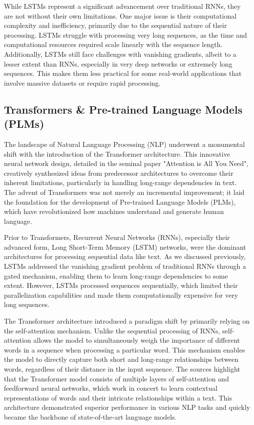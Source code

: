 While LSTMs represent a significant advancement over traditional RNNs, they are not without their own limitations. One major issue is their computational complexity and inefficiency, primarily due to the sequential nature of their processing. LSTMs struggle with processing very long sequences, as the time and computational resources required scale linearly with the sequence length. Additionally, LSTMs still face challenges with vanishing gradients, albeit to a lesser extent than RNNs, especially in very deep networks or extremely long sequences. This makes them less practical for some real-world applications that involve massive datasets or require rapid processing.

\subsection{Transformers \& Pre-trained Language Models (PLMs)}

The landscape of Natural Language Processing (NLP) underwent a monumental shift with the introduction of the Transformer architecture. This innovative neural network design, detailed in the seminal paper "Attention is All You Need", creatively synthesized ideas from predecessor architectures to overcome their inherent limitations, particularly in handling long-range dependencies in text. The advent of Transformers was not merely an incremental improvement; it laid the foundation for the development of Pre-trained Language Models (PLMs), which have revolutionized how machines understand and generate human language.

Prior to Transformers, Recurrent Neural Networks (RNNs), especially their advanced form, Long Short-Term Memory (LSTM) networks, were the dominant architectures for processing sequential data like text. As we discussed previously, LSTMs addressed the vanishing gradient problem of traditional RNNs through a gated mechanism, enabling them to learn long-range dependencies to some extent. However, LSTMs processed sequences sequentially, which limited their parallelization capabilities and made them computationally expensive for very long sequences.

The Transformer architecture introduced a paradigm shift by primarily relying on the self-attention mechanism. Unlike the sequential processing of RNNs, self-attention allows the model to simultaneously weigh the importance of different words in a sequence when processing a particular word. This mechanism enables the model to directly capture both short and long-range relationships between words, regardless of their distance in the input sequence. The sources highlight that the Transformer model consists of multiple layers of self-attention and feedforward neural networks, which work in concert to learn contextual representations of words and their intricate relationships within a text. This architecture demonstrated superior performance in various NLP tasks and quickly became the backbone of state-of-the-art language models.

